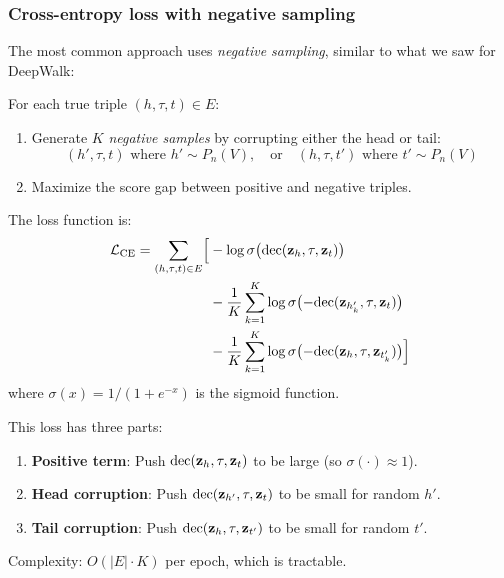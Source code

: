 \begin{notechapter}
\subsubsection*{Cross-entropy loss with negative sampling}

The most common approach uses \emph{negative sampling}, similar to what we saw for DeepWalk:

\begin{definition}
For each true triple $(h, \tau, t) \in E$:
\begin{enumerate}
    \item Generate $K$ \emph{negative samples} by corrupting either the head or tail:
    \[
    (h', \tau, t) \text{ where } h' \sim P_n(V), \quad \text{or} \quad (h, \tau, t') \text{ where } t' \sim P_n(V)
    \]
    \item Maximize the score gap between positive and negative triples.
\end{enumerate}

The loss function is:
\begin{align}
\mathcal{L}_{\text{CE}} = \sum_{(h,\tau,t) \in E} \Bigl[
&-\log \sigma\bigl(\text{dec}(\mathbf{z}_h, \tau, \mathbf{z}_t)\bigr) \nonumber \\
&- \frac{1}{K}\sum_{k=1}^{K} \log \sigma\bigl(-\text{dec}(\mathbf{z}_{h_k'}, \tau, \mathbf{z}_t)\bigr) \nonumber \\
&- \frac{1}{K}\sum_{k=1}^{K} \log \sigma\bigl(-\text{dec}(\mathbf{z}_h, \tau, \mathbf{z}_{t_k'})\bigr)
\Bigr]
\end{align}
where $\sigma(x) = 1/(1+e^{-x})$ is the sigmoid function.
\end{definition}

\begin{intuition}
This loss has three parts:
\begin{enumerate}
    \item \textbf{Positive term}: Push $\text{dec}(\mathbf{z}_h, \tau, \mathbf{z}_t)$ to be large (so $\sigma(\cdot) \approx 1$).
    \item \textbf{Head corruption}: Push $\text{dec}(\mathbf{z}_{h'}, \tau, \mathbf{z}_t)$ to be small for random $h'$.
    \item \textbf{Tail corruption}: Push $\text{dec}(\mathbf{z}_h, \tau, \mathbf{z}_{t'})$ to be small for random $t'$.
\end{enumerate}
Complexity: $O(|E| \cdot K)$ per epoch, which is tractable.
\end{intuition}


\end{notechapter}
